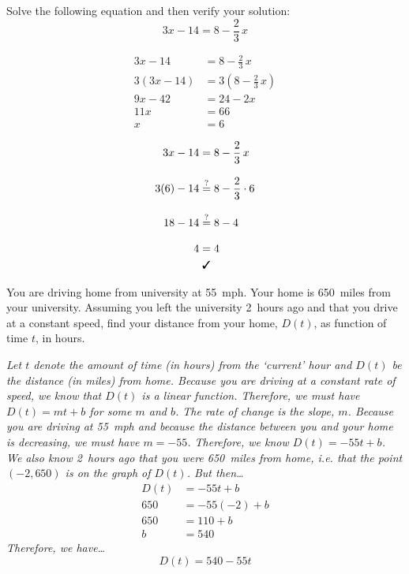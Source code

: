 \documentclass[12pt,letterpaper]{exam}
\begin{document}
\begin{questions}
\newpage



\question[6] Solve the following equation and then verify your solution:
	\[
	3x -14= 8 - \frac{2}{3}\,x
	\] \pspace
	
	\[
	\begin{aligned}
	3x -14&= 8 - \frac{2}{3}\,x \\[0.3cm]
	3(3x - 14)&= 3(8 - \frac{2}{3}\,x) \\[0.3cm]
	9x - 42&= 24 - 2x \\[0.3cm] 
	11x&= 66 \\[0.3cm]
	x&= 6
	\end{aligned}
	\] \pvspace{2cm}
	
	\[
	\begin{aligned}
	3x -14&= 8 - \frac{2}{3}\,x \\[0.3cm]
	3(6) - 14&\stackrel{?}{=} 8 - \frac{2}{3} \cdot 6 \\[0.3cm]
	18 - 14&\stackrel{?}{=} 8 - 4 \\[0.3cm]
	4&= 4 \\
	&\;\text{\cmark}
	\end{aligned}
	\]


\newpage



\question[8] You are driving home from university at 55~mph. Your home is 650~miles from your university. Assuming you left the university 2~hours ago and that you drive at a constant speed, find your distance from your home, $D(t)$, as function of time $t$, in hours. \pspace

{\itshape Let $t$ denote the amount of time (in hours) from the `current' hour and $D(t)$ be the distance (in miles) from home. Because you are driving at a constant rate of speed, we know that $D(t)$ is a linear function. Therefore, we must have $D(t)= mt + b$ for some $m$ and $b$. The rate of change is the slope, $m$. Because you are driving at 55~mph and because the distance between you and your home is decreasing, we must have $m= -55$. Therefore, we know $D(t)= -55t + b$. We also know 2~hours ago that you were 650~miles from home, i.e. that the point $(-2, 650)$ is on the graph of $D(t)$. But then\dots
	\[
	\begin{aligned}
	D(t)&= -55t + b \\[0.3cm]
	650&= -55(-2) + b \\[0.3cm]
	650&= 110 + b \\[0.3cm]
	b&= 540
	\end{aligned}
	\]
Therefore, we have\dots
	\[
	\boxed{D(t)= 540 - 55t}
	\] \vfill

}
\end{questions}
\end{document}
